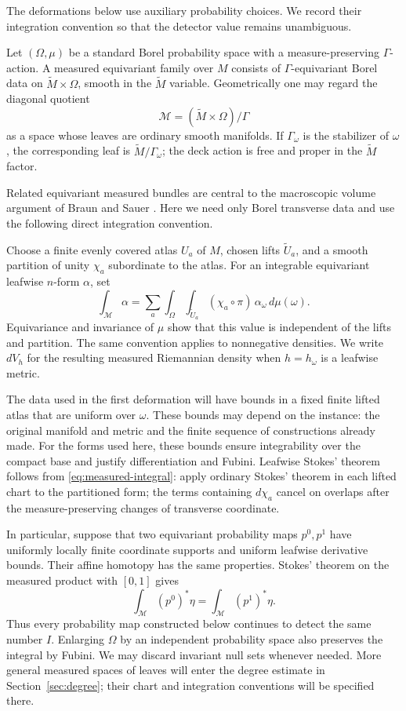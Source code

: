 The deformations below use auxiliary probability choices. We record
their integration convention so that the detector value remains
unambiguous.

Let \((\Omega,\mu)\) be a standard Borel probability space with a
measure-preserving \(\Gamma\)-action. A measured equivariant family
over \(M\) consists of \(\Gamma\)-equivariant Borel data on
\(\widetilde M\times\Omega\), smooth in the \(\widetilde M\) variable.
Geometrically one may regard the diagonal quotient
\[
  \mathcal M=(\widetilde M\times\Omega)/\Gamma
\]
as a space whose leaves are ordinary smooth manifolds. If
\(\Gamma_\omega\) is the stabilizer of \(\omega\), the corresponding
leaf is \(\widetilde M/\Gamma_\omega\); the deck action is free and
proper in the \(\widetilde M\) factor.

Related equivariant measured bundles are central to the macroscopic
volume argument of Braun and Sauer \cite[Sections 1.2 and 4]{BraunSauer2021}.
Here we need only Borel transverse data and use the following direct
integration convention.

Choose a finite evenly covered
atlas \(U_a\) of \(M\), chosen lifts \(\widetilde U_a\), and a smooth
partition of unity \(\chi_a\) subordinate to the atlas. For an
integrable equivariant leafwise \(n\)-form \(\alpha\), set
\begin{equation}
\int_{\mathcal M}\alpha
 =
\sum_a\int_\Omega\int_{\widetilde U_a}
  (\chi_a\circ\pi)\,\alpha_\omega\,d\mu(\omega).
\label{eq:measured-integral}
\end{equation}
Equivariance and invariance of \(\mu\) show that this value is
independent of the lifts and partition. The same convention applies
to nonnegative densities. We write \(dV_h\) for the resulting measured
Riemannian density when \(h=h_\omega\) is a leafwise metric.

The data used in the first deformation will have bounds in a fixed
finite lifted atlas that are uniform over \(\omega\). These bounds
may depend on the instance: the original manifold and metric and the
finite sequence of constructions already made. For the forms used
here, these bounds ensure integrability over the compact base and
justify differentiation and Fubini. Leafwise Stokes' theorem follows from
\eqref{eq:measured-integral}: apply ordinary Stokes' theorem in each
lifted chart to the partitioned form; the terms containing
\(d\chi_a\) cancel on overlaps after the measure-preserving changes of
transverse coordinate.

In particular, suppose that two equivariant probability maps
\(p^0,p^1\) have uniformly locally finite coordinate supports and
uniform leafwise derivative bounds. Their affine homotopy has the
same properties. Stokes' theorem on the measured product with
\([0,1]\) gives
\[
\int_{\mathcal M}(p^0)^*\eta
 =
\int_{\mathcal M}(p^1)^*\eta.
\]
Thus every probability map constructed below continues to detect the
same number \(I\). Enlarging \(\Omega\) by an independent probability
space also preserves the integral by Fubini. We may discard invariant
null sets whenever needed. More general measured spaces of leaves
will enter the degree estimate in Section~\ref{sec:degree}; their chart and
integration conventions will be specified there.
